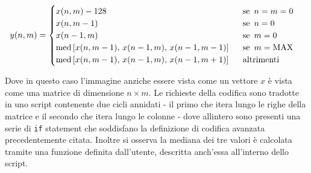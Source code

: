 \begin{gather*}
    y(n, m) = 
    \begin{cases}
        x(n, m) - 128 \hspace{161px} \text{se } \, n = m = 0 \\
        x(n, m - 1) \hspace{171px} \text{se } \, n = 0\\
        x(n - 1, m) \hspace{171px} \text{se } \, m = 0\\
        \text{med}\left[ x(n, m - 1),\, x(n - 1, m),\, x(n - 1, m - 1) \right] \hspace{15px} \text{se } \, m = \text{MAX}\\
        \text{med}\left[ x(n, m - 1),\, x(n - 1, m),\, x(n - 1, m + 1) \right] \hspace{15px} \text{altrimenti}
    \end{cases}
\end{gather*} 

\noindent Dove in questo caso l'immagine anziche essere vista come un vettore $x$ è vista come una matrice di dimensione $n \times m$. Le richieste della codifica sono tradotte in uno script contenente due cicli annidati - il primo che itera lungo le righe della matrice e il secondo che itera lungo le colonne - dove allintero sono presenti una serie di \texttt{if} statement che soddisfano la definizione di codifica avanzata precedentemente citata. Inoltre si osserva la mediana dei tre valori è calcolata tramite una funzione definita dall'utente, descritta anch'essa all'interno dello script. 

